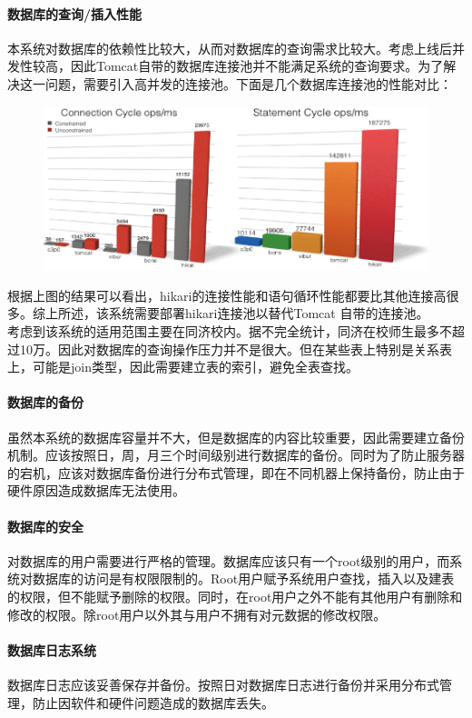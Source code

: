 \documentclass[UTF8]{ctexart}
\begin{document}
\paragraph{数据库的查询/插入性能}
本系统对数据库的依赖性比较大，从而对数据库的查询需求比较大。考虑上线后并发性较高，因此Tomcat自带的数据库连接池并不能满足系统的查询要求。为了解决这一问题，需要引入高并发的连接池。下面是几个数据库连接池的性能对比：\\
\begin{figure}[H]
\centering
\includegraphics[width = .8\textwidth]{database-compare.png}
\end{figure}
根据上图的结果可以看出，hikari的连接性能和语句循环性能都要比其他连接高很多。综上所述，该系统需要部署hikari连接池以替代Tomcat 自带的连接池。\\
考虑到该系统的适用范围主要在同济校内。据不完全统计，同济在校师生最多不超过10万。因此对数据库的查询操作压力并不是很大。但在某些表上特别是关系表上，可能是join类型，因此需要建立表的索引，避免全表查找。

\paragraph{数据库的备份}
虽然本系统的数据库容量并不大，但是数据库的内容比较重要，因此需要建立备份机制。应该按照日，周，月三个时间级别进行数据库的备份。同时为了防止服务器的宕机，应该对数据库备份进行分布式管理，即在不同机器上保持备份，防止由于硬件原因造成数据库无法使用。

\paragraph{数据库的安全}
对数据库的用户需要进行严格的管理。数据库应该只有一个root级别的用户，而系统对数据库的访问是有权限限制的。Root用户赋予系统用户查找，插入以及建表的权限，但不能赋予删除的权限。同时，在root用户之外不能有其他用户有删除和修改的权限。除root用户以外其与用户不拥有对元数据的修改权限。

\paragraph{数据库日志系统}
数据库日志应该妥善保存并备份。按照日对数据库日志进行备份并采用分布式管理，防止因软件和硬件问题造成的数据库丢失。
\end{document}
